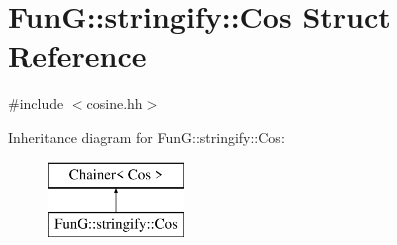 \hypertarget{structFunG_1_1stringify_1_1Cos}{\section{Fun\-G\-:\-:stringify\-:\-:Cos Struct Reference}
\label{structFunG_1_1stringify_1_1Cos}
}


{\ttfamily \#include $<$cosine.\-hh$>$}

Inheritance diagram for Fun\-G\-:\-:stringify\-:\-:Cos\-:\begin{figure}[H]
\begin{center}
\leavevmode
\includegraphics[height=2.000000cm]{structFunG_1_1stringify_1_1Cos}
\end{center}
\end{figure}
